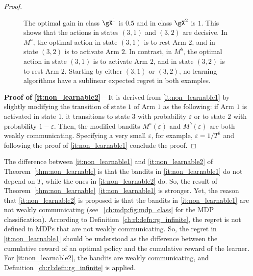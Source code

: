\begin{proof}
\begin{figure}[hp]
{            The optimal gain in class $\gX^1$ is $0.5$ and in class $\gX^2$ is $1$.
            This shows that the actions in states $(3,1)$ and $(3,2)$ are decisive.
            In $M^a$, the optimal action in state $(3,1)$ is to rest Arm $2$, and in state $(3,2)$ is to activate Arm $2$.
            In contrast, in $M^b$, the optimal action in state $(3,1)$ is to activate Arm $2$, and in state $(3,2)$ is to rest Arm $2$.
            Starting by either $(3,1)$ or $(3,2)$, no learning algorithms have a sublinear expected regret in both examples.
        }
        \label{fig:hard_global}
    \end{figure}

    \textbf{Proof of \ref{it:non_learnable2}} -- It is derived from \ref{it:non_learnable1} by slightly modifying the transition of state $1$ of Arm $1$ as the following: if Arm $1$ is activated in state $1$, it transitions to state $3$ with probability $\varepsilon$ or to state $2$ with probability $1-\varepsilon$.
    Then, the modified bandits $M^a(\varepsilon)$ and $M^b(\varepsilon)$ are both weakly communicating.
    Specifying a very small $\varepsilon$, for example, $\varepsilon=1/T^2$ and following the proof of \ref{it:non_learnable1} conclude the proof. 
\end{proof}

The difference between \ref{it:non_learnable1} and \ref{it:non_learnable2} of Theorem~\ref{thm:non_learnable} is that the bandits in \ref{it:non_learnable1} do not depend on $T$, while the ones in \ref{it:non_learnable2} do.
So, the result of Theorem~\ref{thm:non_learnable}~\ref{it:non_learnable1} is stronger.
Yet, the reason that \ref{it:non_learnable2} is proposed is that the bandits in \ref{it:non_learnable1} are not weakly communicating (see \figurename~\ref{ch:mdp:fig:mdp_class} for the MDP classification).
According to Definition~\ref{ch:rl:defn:rg_infinite}, the regret is not defined in MDPs that are not weakly communicating.
So, the regret in \ref{it:non_learnable1} should be understood as the difference between the cumulative reward of an optimal policy and the cumulative reward of the learner. 
For \ref{it:non_learnable2}, the bandits are weakly communicating, and Definition~\ref{ch:rl:defn:rg_infinite} is applied.

